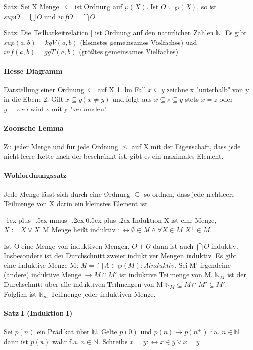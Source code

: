 \documentclass[10pt,landscape]{article}
\makeatletter
\renewcommand{\section}{\@startsection{section}{1}{0mm}%
                                {-1ex plus -.5ex minus -.2ex}%
                                {0.5ex plus .2ex}%
                                {\normalfont\large\bfseries}}
\makeatother
\begin{document}
\begin{multicols}{3}
Satz: Sei X Menge. $\subseteq$ ist Ordnung auf $\wp(X)$. Ist $O\subseteq \wp(X)$, so ist $sup O=\bigcup O$ und $inf O=\bigcap O$

Satz: Die Teilbarkeitrelation | ist Ordnung auf den natürlichen Zahlen $\mathbb{N}$. Es gibt $sup(a,b)=kgV(a,b)$ (kleinstes gemeinsames Vielfaches) und $inf(a,b)=ggT(a,b)$ (größtes gemeinsames Vielfaches)

\paragraph{Hesse Diagramm}
Darstellung einer Ordnung $\subseteq$ auf X
1. Im Fall $x\subseteq y$ zeichne x "unterhalb" von y in die Ebene
2. Gilt $x\subseteq y (x\not = y)$ und folgt aus $x \subseteq z \subseteq y$ stets $x=z$ oder $y=z$ so wird x mit y "verbunden"

\paragraph{Zoonsche Lemma}
Zu jeder Menge und für jede Ordnung $\leq$ auf X mit der Eigenschaft, dass jede nicht-leere Kette nach der beschränkt ist, gibt es ein maximales Element.

\paragraph{Wohlordnungssatz}
Jede Menge lässt sich durch eine Ordnung $\subseteq$ so ordnen, dass jede nichtleere Teilmenge von X darin ein kleinstes Element ist

\section{Induktion}
X ist eine Menge, $X:=X\vee {X}$\
M Menge heißt induktiv $:\leftrightarrow \emptyset \in M \wedge \forall X \in M$  $X^+ \in M$.

Ist O eine Menge von induktiven Mengen, $O\pm O$ dann ist auch $\bigcap O$ induktiv. Insbesondere ist der Durchschnitt zweier induktiver Mengen induktiv. Es gibt eine induktive Menge M: $M =\bigcap {A \in \wp(M): A induktiv}$.
Sei M' irgendeine (andere) induktive Menge $\rightarrow M \cap M'$ ist induktive Teilmenge von M. $\mathbb{N}_M$ ist der Durchschnitt über alle induktiven Teilmengen von M $\mathbb{N}_M \subseteq M \cap M' \subseteq M'$. Folglich ist $\mathbb{N}_m$ Teilmenge jeder induktiven Menge.

\paragraph{Satz I (Induktion I)}
Sei $p(n)$ ein Prädikat über $\mathbb{N}$. Gelte $p(0)$ und $p(n)\rightarrow p(n^{+})$ f.a. $n\in \mathbb{N}$ dann ist $p(n)$ wahr f.a. $n \in \mathbb{N}$. Schreibe $x=y:\leftrightarrow x\in y \vee x=y$


\end{multicols}
\end{document}
